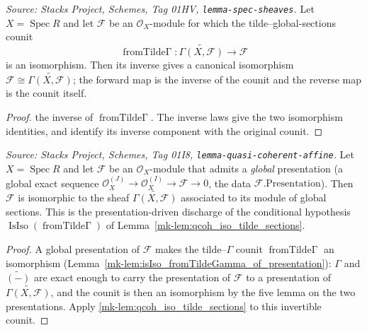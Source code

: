 \begin{lemma}\label{mk-lem:qcoh_iso_tilde_sections}
  \leanok

  \textit{Source: Stacks Project, Schemes, Tag 01HV, \texttt{lemma-spec-sheaves}.}
  Let \(X = \operatorname{Spec} R\) and let \(\mathcal{F}\) be an
  \(\mathcal{O}_X\)-module for which the tilde--global-sections counit
  \[
    \operatorname{fromTilde\Gamma} :
      \widetilde{\Gamma(X,\mathcal F)} \longrightarrow \mathcal F
  \]
  is an isomorphism. Then its inverse gives a canonical isomorphism
  \(\mathcal F\cong\widetilde{\Gamma(X,\mathcal F)}\); the forward map is
  the inverse of the counit and the reverse map is the counit itself.
\end{lemma}
\begin{proof}
  \leanokTake the inverse of
  \(\operatorname{fromTilde\Gamma}\). The inverse laws give the two
  isomorphism identities, and identify its inverse component with the
  original counit.
\end{proof}

\begin{lemma}\label{mk-lem:qcoh_iso_tilde_sections_of_presentation}
  \leanok

  \textit{Source: Stacks Project, Schemes, Tag 01I8, \texttt{lemma-quasi-coherent-affine}.}
  Let \(X = \operatorname{Spec} R\) and let \(\mathcal{F}\) be an \(\mathcal{O}_X\)-module that admits
  a \emph{global} presentation (a global exact sequence
  \(\mathcal{O}_X^{(J)} \to \mathcal{O}_X^{(I)} \to \mathcal{F} \to 0\), the data
  \(\mathcal{F}.\mathrm{Presentation}\)). Then \(\mathcal{F}\) is isomorphic to the sheaf
  \(\widetilde{\Gamma(X, \mathcal{F})}\) associated to its module of global sections. This is the
  presentation-driven discharge of the conditional hypothesis
  \(\operatorname{IsIso}(\operatorname{fromTilde\Gamma})\) of Lemma~\ref{mk-lem:qcoh_iso_tilde_sections}.
\end{lemma}
\begin{proof}
  \leanok
  A global presentation of \(\mathcal{F}\) makes the tilde–\(\Gamma\) counit
  \(\operatorname{fromTilde\Gamma}\) an isomorphism
  (Lemma~\ref{mk-lem:isIso_fromTildeGamma_of_presentation}): \(\Gamma\) and \(\widetilde{(-)}\) are exact
  enough to carry the presentation of \(\mathcal{F}\) to a presentation of
  \(\widetilde{\Gamma(X, \mathcal{F})}\), and the counit is then an isomorphism by the five lemma on
  the two presentations. Apply
  \ref{mk-lem:qcoh_iso_tilde_sections} to this invertible counit.
\end{proof}

